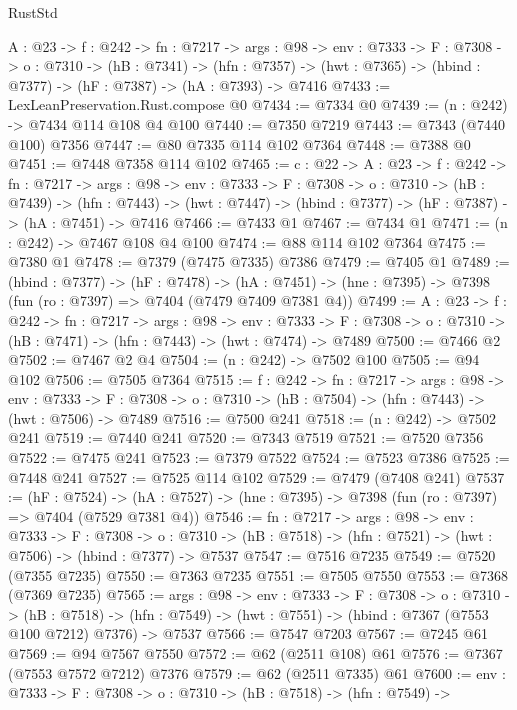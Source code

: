 \begin{lexlean}{RustStd}
\begin{coremodule}
  {A : @23} ->
  {f : @242} ->
  {fn : @7217} ->
  {args : @98} ->
  {env : @7333} ->
  {F : @7308} ->
  {o : @7310} ->
  (hB : @7341) ->
  (hfn : @7357) -> (hwt : @7365) -> (hbind : @7377) -> (hF : @7387) -> (hA : @7393) -> @7416
@7433 := LexLeanPreservation.Rust.compose @0
@7434 := @7334 @0
@7439 := (n : @242) -> @7434 @114 @108 @4 @100
@7440 := @7350 @7219
@7443 := @7343 (@7440 @100) @7356
@7447 := @80 @7335 @114 @102 @7364
@7448 := @7388 @0
@7451 := @7448 @7358 @114 @102
@7465 := {c : @22} ->
  {A : @23} ->
  {f : @242} ->
  {fn : @7217} ->
  {args : @98} ->
  {env : @7333} ->
  {F : @7308} ->
  {o : @7310} ->
  (hB : @7439) ->
  (hfn : @7443) -> (hwt : @7447) -> (hbind : @7377) -> (hF : @7387) -> (hA : @7451) -> @7416
@7466 := @7433 @1
@7467 := @7434 @1
@7471 := (n : @242) -> @7467 @108 @4 @100
@7474 := @88 @114 @102 @7364
@7475 := @7380 @1
@7478 := @7379 (@7475 @7335) @7386
@7479 := @7405 @1
@7489 := (hbind : @7377) ->
  (hF : @7478) ->
  (hA : @7451) -> (hne : @7395) -> @7398 (fun (ro : @7397) => @7404 (@7479 @7409 @7381 @4))
@7499 := {A : @23} ->
  {f : @242} ->
  {fn : @7217} ->
  {args : @98} ->
  {env : @7333} ->
  {F : @7308} -> {o : @7310} -> (hB : @7471) -> (hfn : @7443) -> (hwt : @7474) -> @7489
@7500 := @7466 @2
@7502 := @7467 @2 @4
@7504 := (n : @242) -> @7502 @100
@7505 := @94 @102
@7506 := @7505 @7364
@7515 := {f : @242} ->
  {fn : @7217} ->
  {args : @98} ->
  {env : @7333} ->
  {F : @7308} -> {o : @7310} -> (hB : @7504) -> (hfn : @7443) -> (hwt : @7506) -> @7489
@7516 := @7500 @241
@7518 := (n : @242) -> @7502 @241
@7519 := @7440 @241
@7520 := @7343 @7519
@7521 := @7520 @7356
@7522 := @7475 @241
@7523 := @7379 @7522
@7524 := @7523 @7386
@7525 := @7448 @241
@7527 := @7525 @114 @102
@7529 := @7479 (@7408 @241)
@7537 := (hF : @7524) ->
  (hA : @7527) -> (hne : @7395) -> @7398 (fun (ro : @7397) => @7404 (@7529 @7381 @4))
@7546 := {fn : @7217} ->
  {args : @98} ->
  {env : @7333} ->
  {F : @7308} ->
  {o : @7310} -> (hB : @7518) -> (hfn : @7521) -> (hwt : @7506) -> (hbind : @7377) -> @7537
@7547 := @7516 @7235
@7549 := @7520 (@7355 @7235)
@7550 := @7363 @7235
@7551 := @7505 @7550
@7553 := @7368 (@7369 @7235)
@7565 := {args : @98} ->
  {env : @7333} ->
  {F : @7308} ->
  {o : @7310} ->
  (hB : @7518) ->
  (hfn : @7549) -> (hwt : @7551) -> (hbind : @7367 (@7553 @100 @7212) @7376) -> @7537
@7566 := @7547 @7203
@7567 := @7245 @61
@7569 := @94 @7567 @7550
@7572 := @62 (@2511 @108) @61
@7576 := @7367 (@7553 @7572 @7212) @7376
@7579 := @62 (@2511 @7335) @61
@7600 := {env : @7333} ->
  {F : @7308} ->
  {o : @7310} ->
  (hB : @7518) ->
  (hfn : @7549) ->

\end{coremodule}
\end{lexlean}
